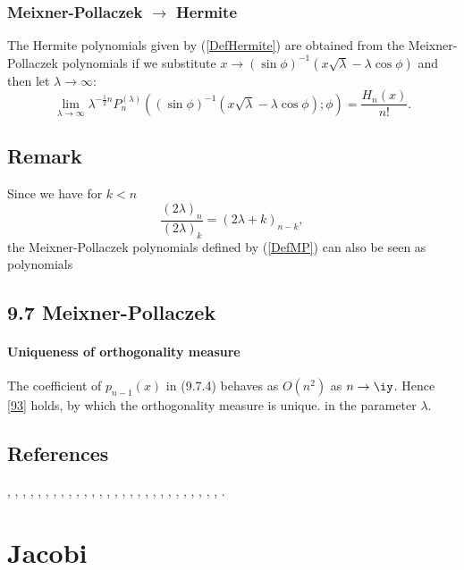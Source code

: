 \documentclass[envcountchap,graybox]{svmono}
\newcounter{rom}
\begin{document}
\subsubsection*{Meixner-Pollaczek $\rightarrow$ Hermite}
The Hermite polynomials given by (\ref{DefHermite}) are obtained from the Meixner-Pollaczek
polynomials if we substitute $x\rightarrow (\sin\phi)^{-1}(x\sqrt{\lambda}-\lambda\cos\phi)$
and then let $\lambda\rightarrow\infty$:
\begin{equation}
\lim_{\lambda\rightarrow\infty}
\lambda^{-\frac{1}{2}n}P_n^{(\lambda)}
((\sin\phi)^{-1}(x\sqrt{\lambda}-\lambda\cos\phi);\phi)=\frac{H_n(x)}{n!}.
\end{equation}

\subsection*{Remark}
Since we have for $k<n$
$$\frac{(2\lambda)_n}{(2\lambda)_k}=(2\lambda+k)_{n-k},$$
the Meixner-Pollaczek polynomials defined by (\ref{DefMP}) can also be seen as polynomials
\subsection*{9.7 Meixner-Pollaczek}
\label{sec9.7}
%
\paragraph{Uniqueness of orthogonality measure}
The coefficient of $p_{n-1}(x)$ in (9.7.4) behaves as $O(n^2)$ as $n\to\iy$.
Hence \eqref{93} holds, by which the orthogonality measure is unique.
in the parameter $\lambda$.

\subsection*{References}
\cite{AlSalam90}, \cite{AlSalamChihara76}, \cite{AndrewsAskey85}, \cite{Araaya2004},
\cite{Araaya2005}, \cite{Askey89I}, \cite{AskeyWilson85}, \cite{AtakRahmanSuslov},
\cite{AtakSuslov88}, \cite{CharrisIsmail}, \cite{ChenIsmail97}, \cite{Chihara78},
\cite{Ismail85II}, \cite{Ismail94}, \cite{Ismail2005II}, \cite{IsmailLi},
\cite{IsmailStanton97}, \cite{Koekoek2000}, \cite{Koorn88}, \cite{Koorn89II},
\cite{LabelleYehI}, \cite{LabelleYehII}, \cite{Lesky95II}, \cite{LiWong}, \cite{Meixner},
\cite{Nikiforov+}, \cite{Rahman78I}, \cite{Wilson80}, \cite{Wimp90}.


\section{Jacobi}
\end{document}
